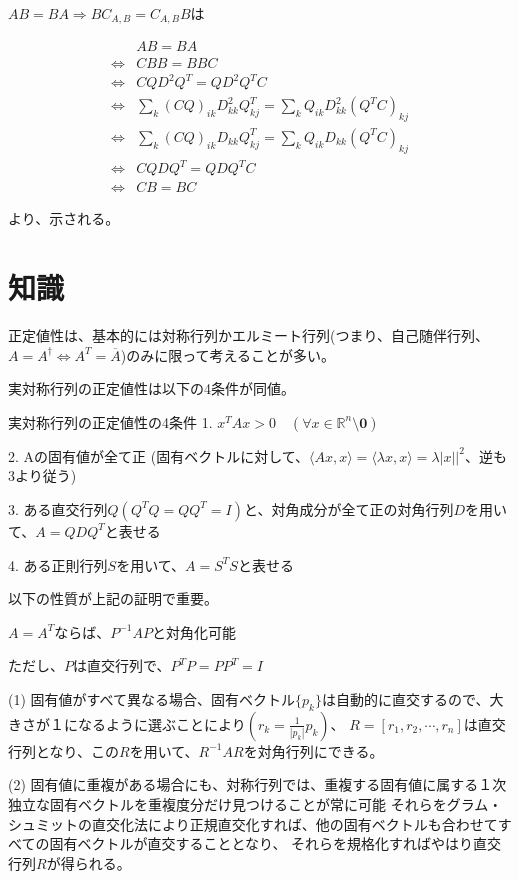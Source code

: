 \documentclass[a4paper, 10pt, dvipdfmx]{jlreq}
\begin{document}
$AB=BA \Rightarrow BC_{A,B}=C_{A,B}B$は

\begin{align*}
                  & AB=BA                                                             \\
  \Leftrightarrow & CBB=BBC                                                           \\
  \Leftrightarrow & CQD^2Q^T=QD^2Q^TC                                                 \\
  \Leftrightarrow & \sum_k (CQ)_{ik}D^2_{kk}Q^T_{kj}=\sum_k Q_{ik}D^2_{kk}(Q^TC)_{kj} \\
  \Leftrightarrow & \sum_k (CQ)_{ik}D_{kk}Q^T_{kj}=\sum_k Q_{ik}D_{kk}(Q^TC)_{kj}     \\
  \Leftrightarrow & CQDQ^T=QDQ^TC                                                     \\
  \Leftrightarrow & CB=BC
\end{align*}

より、示される。

\section{知識}

正定値性は、基本的には対称行列かエルミート行列(つまり、自己随伴行列、$A=A^{\dagger} \Leftrightarrow A^T=\overline{A}$)のみに限って考えることが多い。

実対称行列の正定値性は以下の4条件が同値。

\begin{itembox}[l]{実対称行列の正定値性の4条件}
  1. $x^TAx>0 \quad (\forall x\in \mathbb{R}^n\setminus {\boldsymbol{0}})$

  2. Aの固有値が全て正 (固有ベクトルに対して、$\langle Ax,x \rangle = \langle \lambda x,x \rangle =\lambda |x||^2$、逆も3より従う)

  3. ある直交行列$Q(Q^TQ=QQ^T=I)$と、対角成分が全て正の対角行列$D$を用いて、$A=QDQ^T$と表せる

  4. ある正則行列$S$を用いて、$A=S^TS$と表せる
\end{itembox}


以下の性質が上記の証明で重要。

\begin{itembox}[l]{$A=A^T$ならば、$P^{-1}AP$と対角化可能}

  ただし、$P$は直交行列で、$P^TP=PP^T=I$

  (1) 固有値がすべて異なる場合、固有ベクトル$\{p_k\}$は自動的に直交するので、大きさが１になるように選ぶことにより$(r_k=\frac{1}{|p_k|}p_k)$、
  $R=[r_1, r_2, \cdots, r_n]$は直交行列となり、この$R$を用いて、$R^{-1}AR$を対角行列にできる。

  (2) 固有値に重複がある場合にも、対称行列では、重複する固有値に属する１次独立な固有ベクトルを重複度分だけ見つけることが常に可能
  それらをグラム・シュミットの直交化法により正規直交化すれば、他の固有ベクトルも合わせてすべての固有ベクトルが直交することとなり、 それらを規格化すればやはり直交行列$R$が得られる。
\end{itembox}
\end{document}
